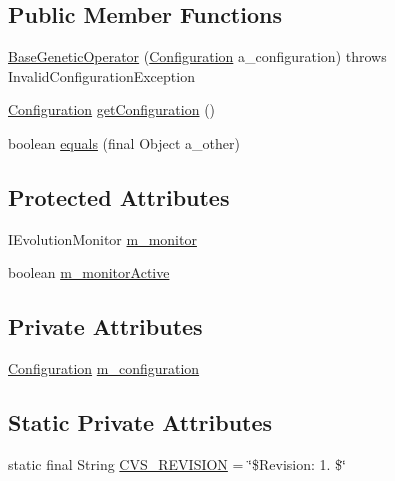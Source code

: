 \subsection*{Public Member Functions}
\begin{DoxyCompactItemize}
\item 
\hyperlink{classorg_1_1jgap_1_1_base_genetic_operator_a061b47c0f891c0041d5ece5bc6e052f8}{Base\-Genetic\-Operator} (\hyperlink{classorg_1_1jgap_1_1_configuration}{Configuration} a\-\_\-configuration)  throws Invalid\-Configuration\-Exception 
\item 
\hyperlink{classorg_1_1jgap_1_1_configuration}{Configuration} \hyperlink{classorg_1_1jgap_1_1_base_genetic_operator_addbc6b98f572331d47397227b7a49f6a}{get\-Configuration} ()
\item 
boolean \hyperlink{classorg_1_1jgap_1_1_base_genetic_operator_a4db6fa1a99177114c0f19f02cd4a87ec}{equals} (final Object a\-\_\-other)
\end{DoxyCompactItemize}
\subsection*{Protected Attributes}
\begin{DoxyCompactItemize}
\item 
I\-Evolution\-Monitor \hyperlink{classorg_1_1jgap_1_1_base_genetic_operator_a516d89e8f56eb2e58768218c7f9cf3de}{m\-\_\-monitor}
\item 
boolean \hyperlink{classorg_1_1jgap_1_1_base_genetic_operator_a5194e705ed206f99852bf158546646b5}{m\-\_\-monitor\-Active}
\end{DoxyCompactItemize}
\subsection*{Private Attributes}
\begin{DoxyCompactItemize}
\item 
\hyperlink{classorg_1_1jgap_1_1_configuration}{Configuration} \hyperlink{classorg_1_1jgap_1_1_base_genetic_operator_ad085c4f27e1cc7b3a3cff5fec3b5f5de}{m\-\_\-configuration}
\end{DoxyCompactItemize}
\subsection*{Static Private Attributes}
\begin{DoxyCompactItemize}
\item 
static final String \hyperlink{classorg_1_1jgap_1_1_base_genetic_operator_aba554ef332d2c5e8ed792e26e466ae12}{C\-V\-S\-\_\-\-R\-E\-V\-I\-S\-I\-O\-N} = \char`\"{}\$Revision\-: 1. \$\char`\"{}
\end{DoxyCompactItemize}
